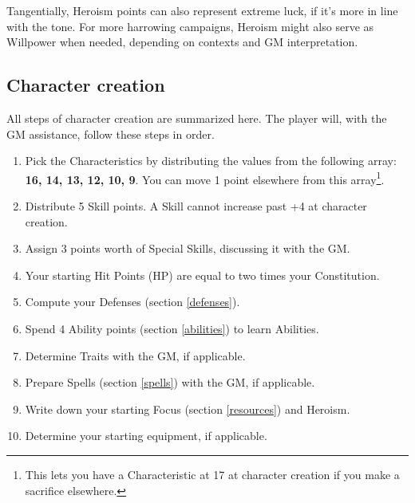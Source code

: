 Tangentially, Heroism points can also represent extreme luck, if it's more in line with the tone. For more harrowing campaigns, Heroism might also serve as Willpower when needed, depending on contexts and GM interpretation.


\subsection{Character creation}
\label{character_creation}

All steps of character creation are summarized here. The player will, with the GM assistance, follow these steps in order.

\begin{enumerate}
    \item Pick the Characteristics by distributing the values from the following array: \textbf{16, 14, 13, 12, 10, 9}. You can move 1 point elsewhere from this array\footnote{This lets you have a Characteristic at 17 at character creation if you make a sacrifice elsewhere.}.
    \item Distribute 5 Skill points. A Skill cannot increase past +4 at character creation.
    \item Assign 3 points worth of Special Skills, discussing it with the GM.
    \item Your starting Hit Points (HP) are equal to two times your Constitution.
    \item Compute your Defenses (section \ref{defenses}).
	\item Spend 4 Ability points (section \ref{abilities}) to learn Abilities. 
    \item Determine Traits with the GM, if applicable.
    \item Prepare Spells (section \ref{spells}) with the GM, if applicable.
	\item Write down your starting Focus (section \ref{resources}) and Heroism.
    \item Determine your starting equipment, if applicable. 
\end{enumerate}















